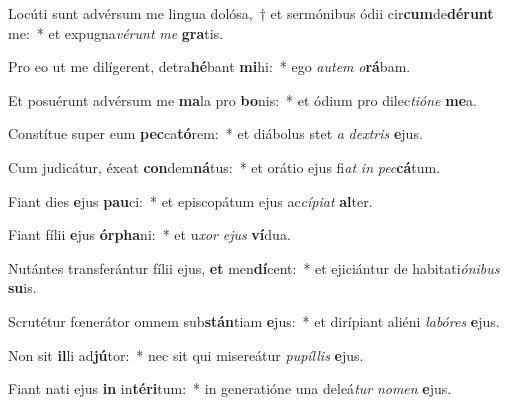 \item Locúti sunt advérsum me lingua dolósa,~† et sermónibus ódii cir\textbf{cum}de\textbf{dé}\textbf{runt} me:~* et expugna\textit{vé}\textit{runt} \textit{me} \textbf{gra}tis.
\item Pro eo ut me dilígerent, detra\textbf{hé}bant \textbf{mi}hi:~* ego \textit{au}\textit{tem} \textit{o}\textbf{rá}bam.
\item Et posuérunt advérsum me \textbf{ma}la pro \textbf{bo}nis:~* et ódium pro dilec\textit{ti}\textit{ó}\textit{ne} \textbf{me}a.
\item Constítue super eum \textbf{pec}ca\textbf{tó}rem:~* et diábolus stet \textit{a} \textit{dex}\textit{tris} \textbf{e}jus.
\item Cum judicátur, éxeat \textbf{con}dem\textbf{ná}tus:~* et orátio ejus fi\textit{at} \textit{in} \textit{pec}\textbf{cá}tum.
\item Fiant dies \textbf{e}jus \textbf{pau}ci:~* et episcopátum ejus ac\textit{cí}\textit{pi}\textit{at} \textbf{al}ter.
\item Fiant fílii \textbf{e}jus \textbf{ór}\textbf{pha}ni:~* et u\textit{xor} \textit{e}\textit{jus} \textbf{ví}dua.
\item Nutántes transferántur fílii ejus, \textbf{et} men\textbf{dí}cent:~* et ejiciántur de habitati\textit{ó}\textit{ni}\textit{bus} \textbf{su}is.
\item Scrutétur fœnerátor omnem sub\textbf{stán}tiam \textbf{e}jus:~* et dirípiant aliéni \textit{la}\textit{bó}\textit{res} \textbf{e}jus.
\item Non sit \textbf{il}li ad\textbf{jú}tor:~* nec sit qui misereátur \textit{pu}\textit{píl}\textit{lis} \textbf{e}jus.
\item Fiant nati ejus \textbf{in} in\textbf{tér}\textbf{i}tum:~* in generatióne una deleá\textit{tur} \textit{no}\textit{men} \textbf{e}jus.
